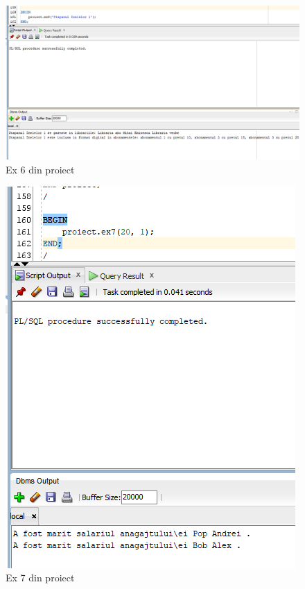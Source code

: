 \documentclass[12pt]{article}
\begin{document}
\begin{figure}[!htb]
\includegraphics[max width=\linewidth]{imgs/ex13_1.png}
\caption{Ex 6 din proiect}
\label{fig:ex13_1}
\end{figure}
\begin{figure}[!htb]
\includegraphics[max width=\linewidth]{imgs/ex13_2.png}
\caption{Ex 7 din proiect}
\label{fig:ex13_2}
\end{figure}
\end{document}
